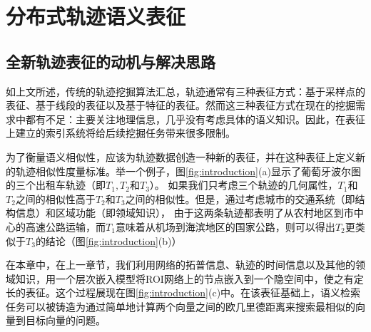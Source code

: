 
\chapter{分布式轨迹语义表征}
\label{chapter:main2}
\section{全新轨迹表征的动机与解决思路}
如上文所述，传统的轨迹挖掘算法汇总，轨迹通常有三种表征方式：基于采样点的表征、基于线段的表征以及基于特征的表征。然而这三种表征方式在现在的挖掘需求中都有不足：主要关注地理信息，几乎没有考虑具体的语义知识。因此，在表征上建立的索引系统将给后续挖掘任务带来很多限制。

为了衡量语义相似性，应该为轨迹数据创造一种新的表征，并在这种表征上定义新的轨迹相似性度量标准。举一个例子，图\ref{fig:introduction}(a)显示了葡萄牙波尔图的三个出租车轨迹（即$ T_1, T_2$和$T_3 $）。 如果我们只考虑三个轨迹的几何属性，$ T_1 $和$ T_2 $之间的相似性高于$ T_2 $和$ T_3 $之间的相似性。但是，通过考虑城市的交通系统（即结构信息）和区域功能（即领域知识）， 由于这两条轨迹都表明了从农村地区到市中心的高速公路运输，而$T_1$意味着从机场到海滨地区的国家公路，则可以得出$ T_2 $更类似于$ T_3 $的结论（图\ref{fig:introduction}(b)）

在本章中，在上一章节，我们利用网络的拓普信息、轨迹的时间信息以及其他的领域知识，用一个层次嵌入模型将ROI网络上的节点嵌入到一个隐空间中，使之有定长的表征。这个过程展现在图\ref{fig:introduction}(c)中。在该表征基础上，语义检索任务可以被铸造为通过简单地计算两个向量之间的欧几里德距离来搜索最相似的向量到目标向量的问题。

